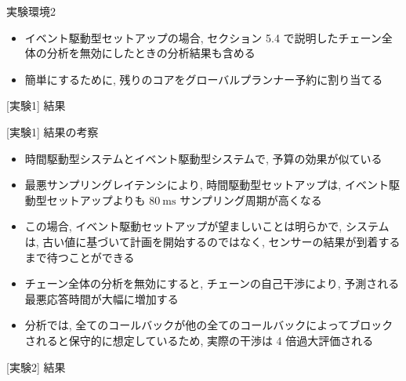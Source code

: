 \begin{frame}{実験環境2}
    \begin{itemize}
        \item イベント駆動型セットアップの場合, セクション 5.4 で説明したチェーン全体の分析を無効にしたときの分析結果も含める
        \item 簡単にするために, 残りのコアをグローバルプランナー予約に割り当てる
    \end{itemize}
\end{frame}

\begin{frame}{[実験1] 結果}
\end{frame}

\begin{frame}{[実験1] 結果の考察}
    \begin{itemize}
        \item 時間駆動型システムとイベント駆動型システムで, 予算の効果が似ている
        \item 最悪サンプリングレイテンシにより, 時間駆動型セットアップは, イベント駆動型セットアップよりも $80 \mathrm{~ms}$ サンプリング周期が高くなる
        \item この場合, イベント駆動セットアップが望ましいことは明らかで, システムは, 古い値に基づいて計画を開始するのではなく, センサーの結果が到着するまで待つことができる
        \item チェーン全体の分析を無効にすると, チェーンの自己干渉により, 予測される最悪応答時間が大幅に増加する
        \item 分析では, 全てのコールバックが他の全てのコールバックによってブロックされると保守的に想定しているため, 実際の干渉は 4 倍過大評価される
    \end{itemize}
\end{frame}

\begin{frame}{[実験2] 結果}
\end{frame}

